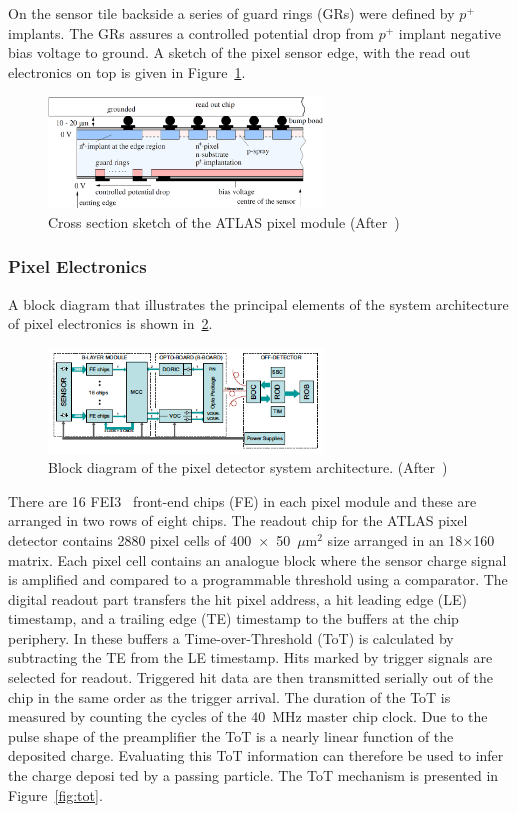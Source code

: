 On the sensor tile backside a series of guard rings (GRs) were defined by $p^+$ implants. The GRs 
assures a controlled potential drop from  $p^+$ implant negative bias voltage to ground. 
A sketch of the pixel sensor edge, with the read out electronics on top is given in 
Figure~\ref{fig:sensorbb}.
\begin{figure}[!htbp]
\centering
\includegraphics[width=0.65\textwidth]{sensorbb.png}
\caption{\label{fig:sensorbb} Cross section sketch of the ATLAS pixel module (After~\cite{Altenheiner:2012zz})}
\end{figure}

\subsubsection{Pixel Electronics}
\label{sec:pixelel}
A block diagram that illustrates the principal elements of the system architecture of pixel 
electronics is shown in~\ref{fig:pixelel}.

\begin{figure}[!htbp]
\centering
\includegraphics[width=0.65\textwidth]{pixelel.png}
\caption{\label{fig:pixelel}Block diagram of the pixel detector system architecture. (After~\cite{AtlasPixels})}
\end{figure}
There are 16 FEI3~\cite{FEI3} front-end chips (FE) in each pixel module and these are arranged in two rows of eight chips. 
The readout chip for the ATLAS pixel detector contains 2880 pixel cells of 400~$\times$~50~$\mu$m$^2$ size arranged in an 18$\times$160 matrix. Each pixel cell contains 
an analogue block where the sensor charge signal is amplified and compared to a programmable
threshold using a comparator. The digital readout part transfers the hit pixel address,
a hit leading edge (LE) timestamp, and a trailing edge (TE) timestamp to the buffers at the chip
periphery. In these buffers a Time-over-Threshold (ToT) is calculated by subtracting the TE from
the LE timestamp. Hits marked by trigger signals are
selected for readout. Triggered hit data are then transmitted serially out of the chip in the same
order as the trigger arrival.
 The duration of the ToT is measured by counting the cycles of the 40~MHz master chip
clock. Due to the pulse shape of
the preamplifier the ToT is a nearly linear function of the deposited charge. 
Evaluating this ToT
information can therefore be used to infer the charge deposi
ted by a passing particle.  The ToT  mechanism is presented in Figure~\ref{fig:tot}.

